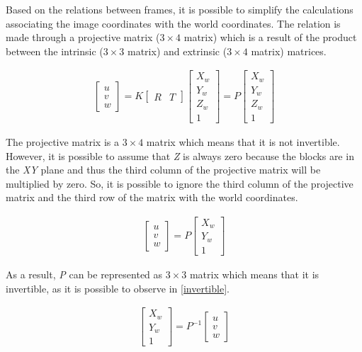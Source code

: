 Based on the relations between frames, it is possible to simplify the calculations associating the image coordinates with the world coordinates. The relation is made through a projective matrix ($3\times 4$ matrix) which is a result of the product between the intrinsic ($3\times 3$ matrix) and extrinsic ($3\times 4$ matrix) matrices.

\begin{align} 
\begin{bmatrix}
    \textit{u} \\ 
    \textit{v} \\
    \textit{w} 
\end{bmatrix}
=
\textit{K}
\begin{bmatrix}
    \textit{R}  & \textit{T}
\end{bmatrix}
\begin{bmatrix}
   X_{w}\\
   Y_{w}\\
   Z_{w}\\
	1
\end{bmatrix}
=
\textit{P}
\begin{bmatrix}
   X_{w}\\
   Y_{w}\\
   Z_{w}\\
	1
\end{bmatrix}
\end{align}

The projective matrix is a $3\times 4$ matrix which means that it is not invertible. However, it is possible to assume that \textit{Z} is always zero because the blocks are in the \textit{XY} plane and thus the third column of the projective matrix will be multiplied by zero. So, it is possible to ignore the third column of the projective matrix and the third row of the matrix with the world coordinates.

\begin{align} 
\begin{bmatrix}
    \textit{u} \\ 
    \textit{v} \\
    \textit{w} 
\end{bmatrix}
=
\textit{P}
\begin{bmatrix}
   X_{w}\\
   Y_{w}\\
	1
\end{bmatrix}
\end{align}

As a result, \textit{P} can be represented as $3\times 3$ matrix which means that it is invertible, as it is possible to observe in \ref{invertible}. 

\begin{align}
\begin{bmatrix}
   X_{w}\\
   Y_{w}\\
	1
\end{bmatrix} 
=
\textit{P}^{-1}
\begin{bmatrix}
    \textit{u} \\ 
    \textit{v} \\
    \textit{w} 
\end{bmatrix}
\label{invertible}
\end{align}

